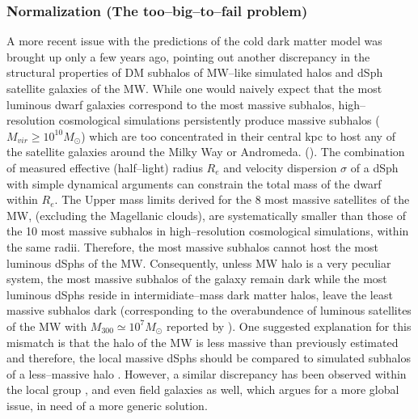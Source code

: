 \documentclass[paper=a4, fontsize=11pt]{scrartcl} %
\numberwithin{equation}{section} %
\numberwithin{figure}{section} %
\numberwithin{table}{section} %
\begin{document}
\subsubsection{Normalization (The too--big--to--fail problem)}
\label{subsec:too-big-to-fail}
A more recent issue with the predictions of the cold dark matter model was brought up only a few years ago, pointing out another discrepancy in the structural properties of DM subhalos of MW--like simulated halos and dSph satellite galaxies of the MW. While one would naively expect that the most luminous dwarf galaxies correspond to the most massive subhalos, high--resolution cosmological simulations persistently produce massive subhalos ($M_{vir} \geq 10^{10} M_\odot$) which are too concentrated in their central kpc to host any of the satellite galaxies around the Milky Way or Andromeda. (\cite{Boylan-Kolchin+2011, Boylan--Kolchin+2012}). The combination of measured effective (half--light) radius $R_e$ and velocity dispersion $\sigma$ of a dSph with simple dynamical arguments can constrain the total mass of the dwarf within $R_e$. The Upper mass limits derived for the 8 most massive satellites of the MW, (excluding the Magellanic clouds), are systematically smaller than those of the 10 most massive subhalos in high--resolution cosmological simulations, within the same radii. Therefore, the most massive subhalos cannot host the most luminous dSphs of the MW. Consequently, unless MW halo is a very peculiar system, the most massive subhalos of the galaxy remain dark while the most luminous dSphs reside in intermidiate--mass dark matter halos, leave the least massive subhalos dark (corresponding to the overabundence of luminous satellites of the MW with $M_{300} \simeq 10^7 M_\odot$ reported by \citet[][]{Kroupa+2010}). One suggested explanation for this mismatch is that the halo of the MW is less massive than previously estimated and therefore, the local massive dSphs should be compared to simulated subhalos of a less--massive halo \citep[][]{Boylan--Kolchin+2012, Wang+2012, Vera--Ciro+2013}. However, a similar discrepancy has been observed within the local group \citep[][]{Kirby+2014, Garrison--Kimmel+2014, Tollerud+2014}, and even field galaxies \citep[][]{Papastergis+2015} as well, which argues for a more global issue, in need of a more generic solution. 

\end{document}
